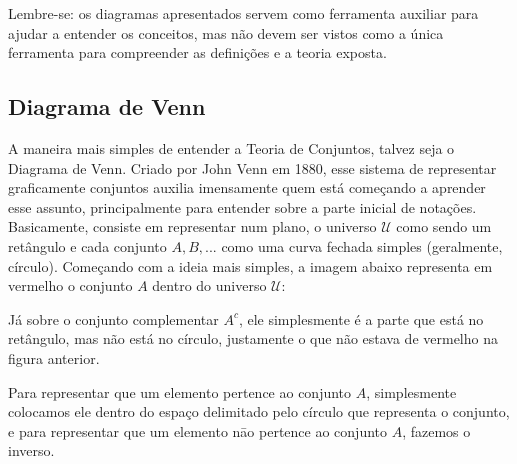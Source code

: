     
    Lembre-se: os diagramas apresentados servem como ferramenta auxiliar para ajudar a entender os conceitos, mas não devem ser vistos como a única ferramenta para compreender as definições e  a teoria exposta.
    
    \newpage
    \subsection{Diagrama de Venn}
    A maneira mais simples de entender a Teoria de Conjuntos, talvez seja o Diagrama de Venn. Criado por John Venn em 1880, esse sistema de representar graficamente conjuntos auxilia imensamente quem está começando a aprender esse assunto, principalmente para entender sobre a parte inicial de notações. Basicamente, consiste em representar num plano, o universo $\mathcal U$ como sendo um retângulo e cada conjunto $A,B,...$ como uma curva fechada simples (geralmente, círculo). Começando com a ideia mais simples, a imagem abaixo representa em vermelho o conjunto $A$ dentro do universo $\mathcal U$:
    
    
    Já sobre o conjunto complementar $A^c$, ele simplesmente é a parte que está no retângulo, mas não está no círculo, justamente o que não estava de vermelho na figura anterior.
    
    
    Para representar que um elemento pertence ao conjunto $A$, simplesmente colocamos ele dentro do espaço delimitado pelo círculo que representa o conjunto, e para representar que um elemento nāo pertence ao conjunto $A$, fazemos o inverso.
    
